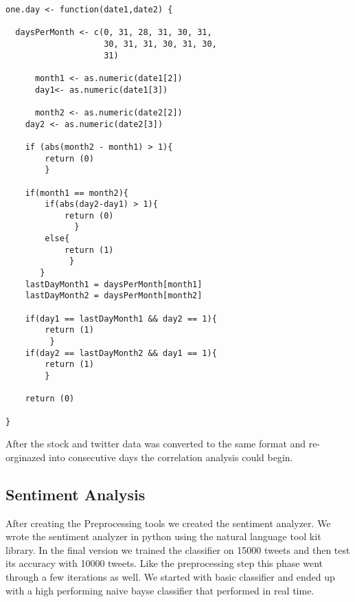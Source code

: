 \documentclass{acm_proc_article-sp}
\begin{document}
\break 
\begin{verbatim}
one.day <- function(date1,date2) {

  daysPerMonth <- c(0, 31, 28, 31, 30, 31, 
                    30, 31, 31, 30, 31, 30, 
                    31)
       
      month1 <- as.numeric(date1[2])
      day1<- as.numeric(date1[3])

      month2 <- as.numeric(date2[2])
    day2 <- as.numeric(date2[3])

    if (abs(month2 - month1) > 1){
        return (0)
        }

    if(month1 == month2){
        if(abs(day2-day1) > 1){
            return (0)
              }
        else{
            return (1)
             }
       }
    lastDayMonth1 = daysPerMonth[month1]
    lastDayMonth2 = daysPerMonth[month2]

    if(day1 == lastDayMonth1 && day2 == 1){
        return (1)
         }
    if(day2 == lastDayMonth2 && day1 == 1){
        return (1)
        }

    return (0)

}

\end{verbatim}

After the stock and twitter data was converted to the same format and
re-orginazed into consecutive days the correlation analysis could begin. 

\subsection{Sentiment Analysis}

After creating the Preprocessing tools we created the sentiment analyzer.
We wrote the sentiment analyzer in python using the natural
language tool kit library. In the final version we trained the classifier on 15000 tweets and then test its
accuracy with 10000 tweets. Like the preprocessing step this phase went through
a few iterations as well. We started with basic classifier and ended up with 
a high performing naive bayse classifier that performed in real time.
\end{document}
